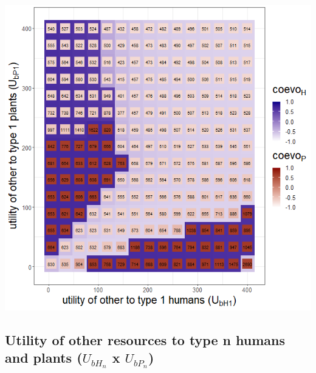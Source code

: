 \documentclass[
]{book}
\begin{document}
\includegraphics[width=1\linewidth]{plots/3_exp_utility_other_to_type_1-tripleRaster_twoParameters}

\newpage

\hypertarget{utility-of-other-resources-to-type-n-humans-and-plants-u_bh_n-x-u_bp_n}{%
\subsection{\texorpdfstring{Utility of other resources to type n humans and plants (\(U_{bH_{n}}\) x \(U_{bP_{n}}\))}{Utility of other resources to type n humans and plants (U\_\{bH\_\{n\}\} x U\_\{bP\_\{n\}\})}}\label{utility-of-other-resources-to-type-n-humans-and-plants-u_bh_n-x-u_bp_n}}

\end{document}
